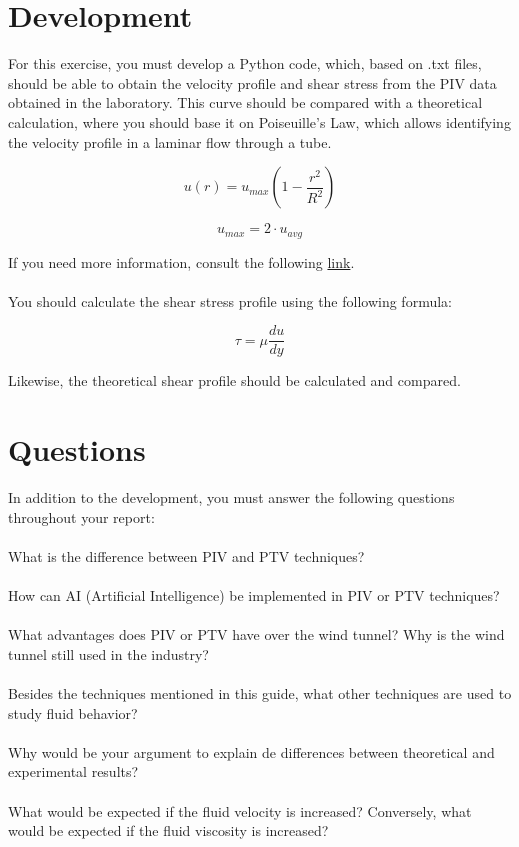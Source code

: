 \documentclass{article} %
\begin{document}
\section{Development}

For this exercise, you must develop a Python code, which, based on .txt files, should be able to obtain the velocity profile and shear stress from the PIV data obtained in the laboratory.
This curve should be compared with a theoretical calculation, where you should base it on Poiseuille's Law, which allows identifying the velocity profile in a laminar flow through a tube.

\begin{equation}
    u(r) = u_{max}(1 - \frac{r^2}{R^2})
\end{equation}

\begin{equation}
    u_{max} = 2 \cdot u_{avg}
\end{equation}

If you need more information, consult the following \href{https://www.simscale.com/docs/validation-cases/hagen-poiseuille-flow/}{link}.
\\ \\
You should calculate the shear stress profile using the following formula:

\begin{equation}
    \tau = \mu \frac{du}{dy}
\end{equation}

Likewise, the theoretical shear profile should be calculated and compared.

\newpage
\section{Questions}

In addition to the development, you must answer the following questions throughout your report:
\\ \\
What is the difference between PIV and PTV techniques?
\\ \\
How can AI (Artificial Intelligence) be implemented in PIV or PTV techniques?
\\ \\
What advantages does PIV or PTV have over the wind tunnel? Why is the wind tunnel still used in the industry?
\\ \\
Besides the techniques mentioned in this guide, what other techniques are used to study fluid behavior?
\\ \\
Why would be your argument to explain de differences between theoretical and experimental results?
\\ \\
What would be expected if the fluid velocity is increased? Conversely, what would be expected if the fluid viscosity is increased?
\end{document}
